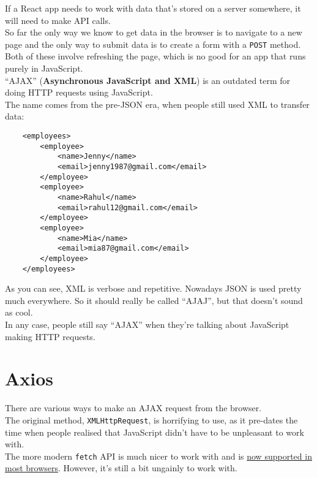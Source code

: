 If a React app needs to work with data that's stored on a server somewhere, it will need to make API calls.
\\

So far the only way we know to get data in the browser is to navigate to a new page and the only way to submit data is to create a form with a \texttt{POST} method. Both of these involve refreshing the page, which is no good for an app that runs purely in JavaScript.
\\


``AJAX'' (\textbf{Asynchronous JavaScript and XML}) is an outdated term for doing HTTP requests using JavaScript.
\\

The name comes from the pre-JSON era, when people still used XML to transfer data:

\begin{verbatim}
    <employees>
        <employee>
            <name>Jenny</name>
            <email>jenny1987@gmail.com</email>
        </employee>
        <employee>
            <name>Rahul</name>
            <email>rahul12@gmail.com</email>
        </employee>
        <employee>
            <name>Mia</name>
            <email>mia87@gmail.com</email>
        </employee>
    </employees>
\end{verbatim}

As you can see, XML is verbose and repetitive. Nowadays JSON is used pretty much everywhere. So it should really be called ``AJAJ'', but that doesn't sound as cool.
\\

In any case, people still say ``AJAX'' when they're talking about JavaScript making HTTP requests.


\section{Axios}

There are various ways to make an AJAX request from the browser.
\\

The original method, \texttt{XMLHttpRequest}, is horrifying to use, as it pre-dates the time when people realised that JavaScript didn't have to be unpleasant to work with.
\\

The more modern \texttt{fetch} API is much nicer to work with and is \href{https://caniuse.com/#feat=fetch}{now supported in most browsers}. However, it's still a bit ungainly to work with.
\\

